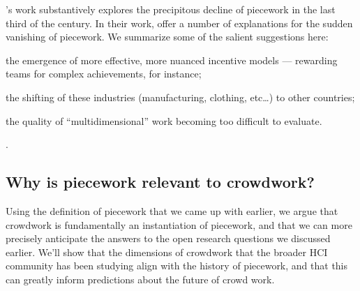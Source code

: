 \documentclass[trackingWork]{subfiles}
\begin{document}
\citeauthor{hart2013rise}'s work substantively explores the precipitous decline of piecework in the last third of the  century.
In their work, \citeauthor{hart2013rise} offer a number of explanations for the sudden vanishing of piecework.
We summarize some of the salient suggestions here:
\begin{inlinelist}
\item the emergence of more effective, more nuanced incentive models
--- rewarding teams for complex achievements, for instance;
\item the shifting of these industries (manufacturing, clothing, etc\dots)
to other countries;
\item the quality of ``multidimensional'' work becoming too difficult to evaluate.
\end{inlinelist}
\cite{hart2013rise}.



\subsection{Why is piecework relevant to crowdwork?}
Using the definition of piecework that we came up with earlier, we argue that
crowdwork is fundamentally an instantiation of piecework, and
that we can more precisely anticipate the answers to the open research questions we discussed earlier.
We'll show that the dimensions of crowdwork that the broader HCI community has been studying
align with the history of piecework, and that this can greatly inform predictions about the future of crowd work.


\onlyinsubfile{
  \printbibliography
  }
\end{document}
